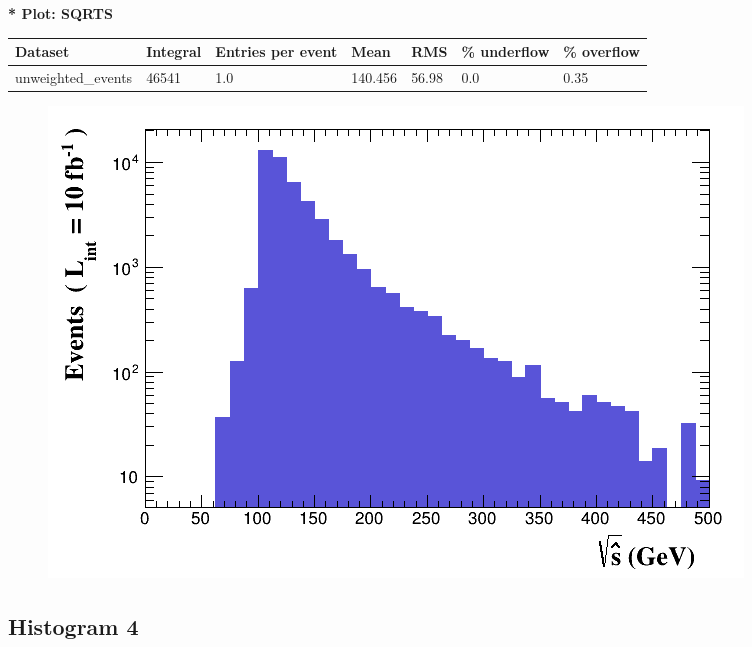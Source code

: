 \documentclass[a4paper, 10pt]{article}
\begin{document}
\textbf{* Plot: SQRTS}\\
   \begin{table}[H]
  \begin{center}
    \begin{tabular}{|m{23.0mm}|m{23.0mm}|m{18.0mm}|m{19.0mm}|m{19.0mm}|m{19.0mm}|m{19.0mm}|}
      \hline
      {\cellcolor{yellow}         Dataset}& {\cellcolor{yellow}         Integral}& {\cellcolor{yellow}         Entries per event}& {\cellcolor{yellow}         Mean}& {\cellcolor{yellow}         RMS}& {\cellcolor{yellow}         \% underflow}& {\cellcolor{yellow}         \% overflow}\\
      \hline
      {\cellcolor{white}         unweighted\_events}& {\cellcolor{white}         46541}& {\cellcolor{white}         1.0}& {\cellcolor{white}         140.456}& {\cellcolor{white}         56.98}& {\cellcolor{green}         0.0}& {\cellcolor{green}         0.35}\\
\hline
    \end{tabular}
  \end{center}
\end{table}

\begin{figure}[H]
  \begin{center}
    \includegraphics[scale=0.45]{selection_2.png}\\
\caption{   }
  \end{center}
\end{figure}
      \newpage
\subsection{ Histogram 4}
\end{document}
